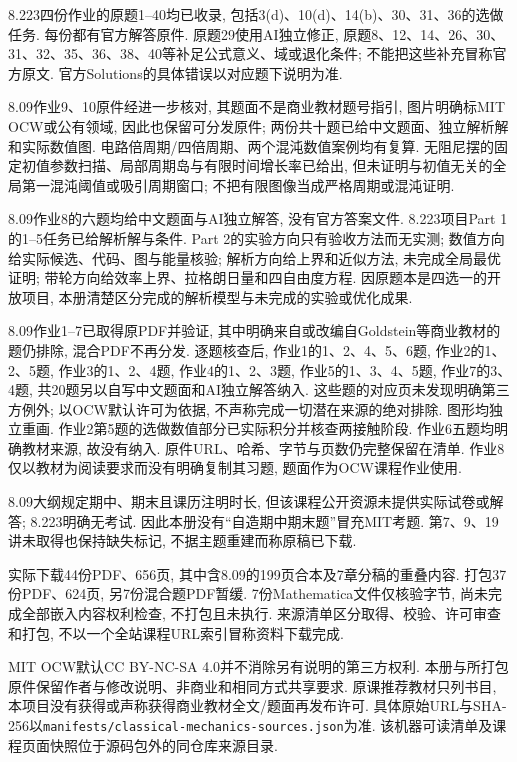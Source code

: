 8.223四份作业的原题1--40均已收录, 包括3(d)、10(d)、14(b)、30、31、36的选做任务. 每份都有官方解答原件. 原题29使用AI独立修正, 原题8、12、14、26、30、31、32、35、36、38、40等补足公式意义、域或退化条件; 不能把这些补充冒称官方原文. 官方Solutions的具体错误以对应题下说明为准.

8.09作业9、10原件经进一步核对, 其题面不是商业教材题号指引, 图片明确标MIT OCW或公有领域, 因此也保留可分发原件; 两份共十题已给中文题面、独立解析解和实际数值图. 电路倍周期/四倍周期、两个混沌数值案例均有复算. 无阻尼摆的固定初值参数扫描、局部周期岛与有限时间增长率已给出, 但未证明与初值无关的全局第一混沌阈值或吸引周期窗口; 不把有限图像当成严格周期或混沌证明.

8.09作业8的六题均给中文题面与AI独立解答, 没有官方答案文件. 8.223项目Part 1的1--5任务已给解析解与条件. Part 2的实验方向只有验收方法而无实测; 数值方向给实际候选、代码、图与能量核验; 解析方向给上界和近似方法, 未完成全局最优证明; 带轮方向给效率上界、拉格朗日量和四自由度方程. 因原题本是四选一的开放项目, 本册清楚区分完成的解析模型与未完成的实验或优化成果.

8.09作业1--7已取得原PDF并验证, 其中明确来自或改编自Goldstein等商业教材的题仍排除, 混合PDF不再分发. 逐题核查后, 作业1的1、2、4、5、6题, 作业2的1、2、5题, 作业3的1、2、4题, 作业4的1、2、3题, 作业5的1、3、4、5题, 作业7的3、4题, 共20题另以自写中文题面和AI独立解答纳入. 这些题的对应页未发现明确第三方例外; 以OCW默认许可为依据, 不声称完成一切潜在来源的绝对排除. 图形均独立重画. 作业2第5题的选做数值部分已实际积分并核查两接触阶段. 作业6五题均明确教材来源, 故没有纳入. 原件URL、哈希、字节与页数仍完整保留在清单. 作业8仅以教材为阅读要求而没有明确复制其习题, 题面作为OCW课程作业使用.

8.09大纲规定期中、期末且课历注明时长, 但该课程公开资源未提供实际试卷或解答; 8.223明确无考试. 因此本册没有“自造期中期末题”冒充MIT考题. 第7、9、19讲未取得也保持缺失标记, 不据主题重建而称原稿已下载.

实际下载44份PDF、656页, 其中含8.09的199页合本及7章分稿的重叠内容. 打包37份PDF、624页, 另7份混合题PDF暂缓. 7份Mathematica文件仅核验字节, 尚未完成全部嵌入内容权利检查, 不打包且未执行. 来源清单区分取得、校验、许可审查和打包, 不以一个全站课程URL索引冒称资料下载完成.

MIT OCW默认CC BY-NC-SA 4.0并不消除另有说明的第三方权利. 本册与所打包原件保留作者与修改说明、非商业和相同方式共享要求. 原课推荐教材只列书目, 本项目没有获得或声称获得商业教材全文/题面再发布许可. 具体原始URL与SHA-256以\texttt{manifests/classical-mechanics-sources.json}为准. 该机器可读清单及课程页面快照位于源码包外的同仓库来源目录.
